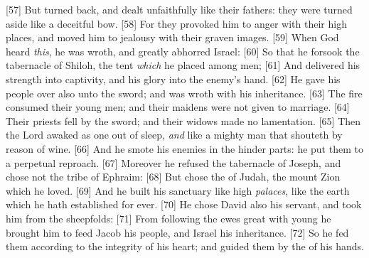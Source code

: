 [57] \textcolor[cmyk]{0.99998,1,0,0}{But turned back, and dealt unfaithfully like their fathers: they were turned aside like a deceitful bow.}
[58] \textcolor[cmyk]{0.99998,1,0,0}{For they provoked him to anger with their high places, and moved him to jealousy with their graven images.}
[59] \textcolor[cmyk]{0.99998,1,0,0}{When God heard \emph{this}, he was wroth, and greatly abhorred Israel:}
[60] \textcolor[cmyk]{0.99998,1,0,0}{So that he forsook the tabernacle of Shiloh, the tent \emph{which} he placed among men;}
[61] \textcolor[cmyk]{0.99998,1,0,0}{And delivered his strength into captivity, and his glory into the enemy's hand.}
[62] \textcolor[cmyk]{0.99998,1,0,0}{He gave his people over also unto the sword; and was wroth with his inheritance.}
[63] \textcolor[cmyk]{0.99998,1,0,0}{The fire consumed their young men; and their maidens were not given to marriage.}
[64] \textcolor[cmyk]{0.99998,1,0,0}{Their priests fell by the sword; and their widows made no lamentation.}
[65] \textcolor[cmyk]{0.99998,1,0,0}{Then the Lord awaked as one out of sleep, \emph{and} like a mighty man that shouteth by reason of wine.}
[66] \textcolor[cmyk]{0.99998,1,0,0}{And he smote his enemies in the hinder parts: he put them to a perpetual reproach.}
[67] \textcolor[cmyk]{0.99998,1,0,0}{Moreover he refused the tabernacle of Joseph, and chose not the tribe of Ephraim:}
[68] \textcolor[cmyk]{0.99998,1,0,0}{But chose the  of Judah, the mount Zion which he loved.}
[69] \textcolor[cmyk]{0.99998,1,0,0}{And he built his sanctuary like high \emph{palaces}, like the earth which he hath established for ever.}
[70] \textcolor[cmyk]{0.99998,1,0,0}{He chose David also his servant, and took him from the sheepfolds:}
[71] \textcolor[cmyk]{0.99998,1,0,0}{From following the ewes great with young he brought him to feed Jacob his people, and Israel his inheritance.}
[72] \textcolor[cmyk]{0.99998,1,0,0}{So he fed them according to the integrity of his heart; and guided them by the  of his hands.}